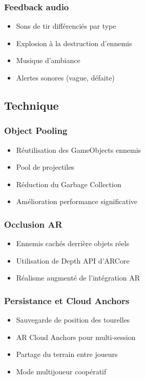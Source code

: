 \documentclass[12pt,a4paper]{article}
\begin{document}
\subsubsection{Feedback audio}
\begin{itemize}
    \item Sons de tir différenciés par type
    \item Explosion à la destruction d'ennemis
    \item Musique d'ambiance
    \item Alertes sonores (vague, défaite)
\end{itemize}

\subsection{Technique}

\subsubsection{Object Pooling}
\begin{itemize}
    \item Réutilisation des GameObjects ennemis
    \item Pool de projectiles
    \item Réduction du Garbage Collection
    \item Amélioration performance significative
\end{itemize}

\subsubsection{Occlusion AR}
\begin{itemize}
    \item Ennemis cachés derrière objets réels
    \item Utilisation de Depth API d'ARCore
    \item Réalisme augmenté de l'intégration AR
\end{itemize}

\subsubsection{Persistance et Cloud Anchors}
\begin{itemize}
    \item Sauvegarde de position des tourelles
    \item AR Cloud Anchors pour multi-session
    \item Partage du terrain entre joueurs
    \item Mode multijoueur coopératif
\end{itemize}
\end{document}
